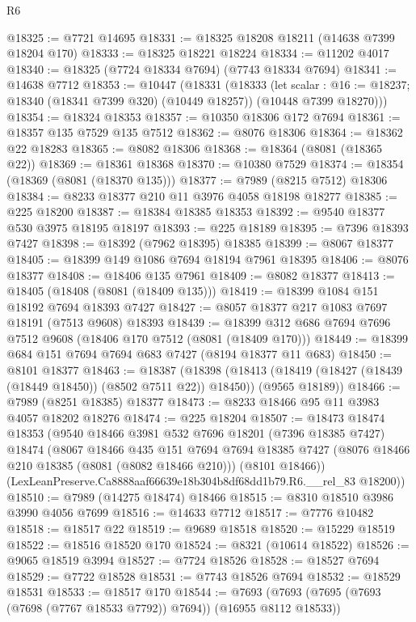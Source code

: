 \begin{lexlean}{R6}
\begin{coremodule}
@18325 := @7721 @14695
@18331 := @18325 @18208 @18211 (@14638 @7399 @18204 @170)
@18333 := @18325 @18221 @18224
@18334 := @11202 @4017
@18340 := @18325 (@7724 @18334 @7694) (@7743 @18334 @7694)
@18341 := @14638 @7712
@18353 := @10447
    (@18331
      (@18333
        (let scalar : @16 := @18237; @18340 (@18341 @7399 @320) (@10449 @18257))
        (@10448 @7399 @18270)))
@18354 := @18324 @18353
@18357 := @10350 @18306 @172 @7694
@18361 := @18357 @135 @7529 @135 @7512
@18362 := @8076 @18306
@18364 := @18362 @22 @18283
@18365 := @8082 @18306
@18368 := @18364 (@8081 (@18365 @22))
@18369 := @18361 @18368
@18370 := @10380 @7529
@18374 := @18354 (@18369 (@8081 (@18370 @135)))
@18377 := @7989 (@8215 @7512) @18306
@18384 := @8233 @18377 @210 @11 @3976 @4058 @18198 @18277
@18385 := @225 @18200
@18387 := @18384 @18385 @18353
@18392 := @9540 @18377 @530 @3975 @18195 @18197
@18393 := @225 @18189
@18395 := @7396 @18393 @7427
@18398 := @18392 (@7962 @18395) @18385
@18399 := @8067 @18377
@18405 := @18399 @149 @1086 @7694 @18194 @7961 @18395
@18406 := @8076 @18377
@18408 := @18406 @135 @7961
@18409 := @8082 @18377
@18413 := @18405 (@18408 (@8081 (@18409 @135)))
@18419 := @18399 @1084 @151 @18192 @7694 @18393 @7427
@18427 := @8057 @18377 @217 @1083 @7697 @18191 (@7513 @9608) @18393
@18439 := @18399 @312 @686 @7694 @7696 @7512 @9608 (@18406 @170 @7512 (@8081 (@18409 @170)))
@18449 := @18399 @684 @151 @7694 @7694 @683 @7427 (@8194 @18377 @11 @683)
@18450 := @8101 @18377
@18463 := @18387
    (@18398
      (@18413 (@18419 (@18427 (@18439 (@18449 @18450)) (@8502 @7511 @22)) @18450))
      (@9565 @18189))
@18466 := @7989 (@8251 @18385) @18377
@18473 := @8233 @18466 @95 @11 @3983 @4057 @18202 @18276
@18474 := @225 @18204
@18507 := @18473
    @18474
    @18353
    (@9540
      @18466
      @3981
      @532
      @7696
      @18201
      (@7396 @18385 @7427)
      @18474
      (@8067
        @18466
        @435
        @151
        @7694
        @7694
        @18385
        @7427
        (@8076 @18466 @210 @18385 (@8081 (@8082 @18466 @210)))
        (@8101 @18466))
      (LexLeanPreserve.Ca8888aaf66639e18b304b8df68dd1b79.R6.__rel_83 @18200))
@18510 := @7989 (@14275 @18474) @18466
@18515 := @8310 @18510 @3986 @3990 @4056 @7699
@18516 := @14633 @7712
@18517 := @7776 @10482
@18518 := @18517 @22
@18519 := @9689 @18518
@18520 := @15229 @18519
@18522 := @18516 @18520 @170
@18524 := @8321 (@10614 @18522)
@18526 := @9065 @18519 @3994
@18527 := @7724 @18526
@18528 := @18527 @7694
@18529 := @7722 @18528
@18531 := @7743 @18526 @7694
@18532 := @18529 @18531
@18533 := @18517 @170
@18544 := @7693 (@7693 (@7695 (@7693 (@7698 (@7767 @18533 @7792)) @7694)) (@16955 @8112 @18533))

\end{coremodule}
\end{lexlean}
